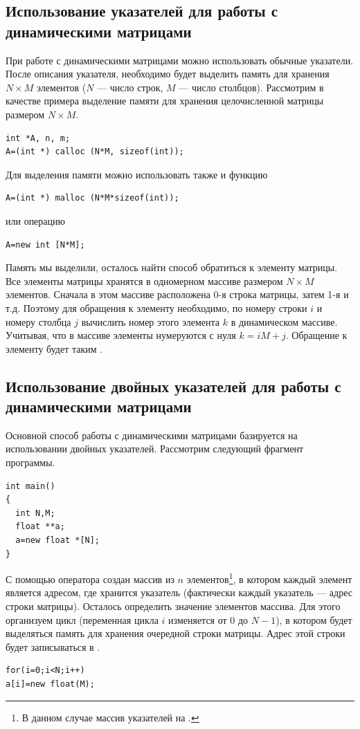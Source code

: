 \subsection[Использование указателей для работы с динамическими матрицами]{Использование указателей для работы с
динамическими матрицами}
При работе с динамическими матрицами можно использовать обычные указатели. После описания указателя, необходимо будет
выделить память для хранения $N\times M$ элементов ($N$ --- число строк, $M$ --- число столбцов). Рассмотрим
в качестве примера выделение памяти для хранения целочисленной матрицы размером $N\times M$.
\begin{lstlisting}
int *A, n, m;
A=(int *) calloc (N*M, sizeof(int));
\end{lstlisting}
Для выделения памяти можно использовать также и функцию  
\begin{lstlisting}
A=(int *) malloc (N*M*sizeof(int));
\end{lstlisting}
или операцию 
\begin{lstlisting}
A=new int [N*M];
\end{lstlisting}

Память мы выделили, осталось найти способ обратиться к элементу матрицы. Все элементы матрицы хранятся в одномерном
массиве размером $N\times M$ элементов. Сначала в этом массиве расположена 0-я строка матрицы, затем 1-я и т.д.
Поэтому для обращения к элементу  необходимо, по номеру строки $i$ и номеру столбца $j$ вычислить номер этого
элемента $k$ в динамическом массиве. Учитывая, что в массиве элементы нумеруются с нуля
$k=iM+j$. Обращение к элементу 
будет таким .

\subsection[Использование двойных указателей для работы с динамическими матрицами]{Использование двойных указателей
для работы с динамическими матрицами}
Основной способ работы с динамическими матрицами базируется на использовании двойных указателей. Рассмотрим следующий
фрагмент программы.
\begin{lstlisting}
int main()
{
  int N,M; 
  float **a;
  a=new float *[N];
}
\end{lstlisting}

С помощью оператора  создан массив из $n$ элементов\footnote{В данном случае массив указателей 
на .}, в котором
каждый элемент является адресом, где хранится указатель (фактически каждый указатель --- адрес строки матрицы). Осталось
определить значение элементов массива. Для этого организуем цикл (переменная цикла $i$ изменяется от 0 до
$N-1$), в котором будет выделяться память для хранения очередной строки матрицы. Адрес этой строки будет
записываться в .
\begin{lstlisting}
for(i=0;i<N;i++)
a[i]=new float(M);
\end{lstlisting}

